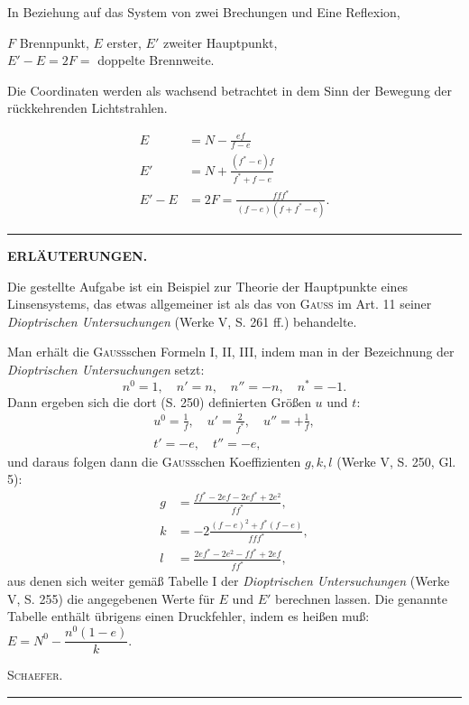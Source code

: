 In Beziehung auf das System von zwei Brechungen und Eine Reflexion,
\begin{center}
$F$ Brennpunkt, $E$ erster, $E'$ zweiter Hauptpunkt,\\
$E'-E=2F=$ doppelte Brennweite.
\end{center}
\noindent Die Coordinaten werden als wachsend betrachtet in dem Sinn der Bewegung der rückkehrenden Lichtstrahlen.
\begin{center}\textbf{}\end{center}
\begin{align}
E&=N-\frac{ef}{f-e}\tag*{I.}\\[5pt]
E'&=N+\frac{(f^{*}-e)f}{f^{*}+f-e}\tag*{II.}\\[5pt]
E'-E&=2F=\frac{fff^{*}}{(f-e)(f+f^{*}-e)}.\tag*{III.}
\end{align}
\begin{center}\rule{.25\linewidth}{.4pt}\end{center}
\clearpage{}
\begin{center}\textbf{ERLÄUTERUNGEN.}\end{center}
\noindent\hspace*{\parindent}Die gestellte Aufgabe ist ein Beispiel zur Theorie der Hauptpunkte eines Linsensystems, das etwas allgemeiner ist als das von \textsc{Gauss} im Art. 11 seiner \textit{Dioptrischen Untersuchungen} (Werke V, S. 261 ff.) behandelte.

Man erhält die \textsc{Gauss}schen Formeln I, II, III, indem man in der Bezeichnung der \textit{Dioptrischen Untersuchungen} setzt:
\[
n^0=1,\quad n'=n,\quad n''=-n,\quad n^{*}=-1.
\]
\noindent Dann ergeben sich die dort (S. 250) definierten Größen $u$ und $t$:
\[
\begin{gathered}
u^0=\frac1f,\quad u'=\frac2{f^{*}},\quad u''=+\frac1f,\\[5pt]
t'=-e,\quad t''=-e,
\end{gathered}
\]
\noindent und daraus folgen dann die \textsc{Gauss}schen Koeffizienten $g,k,l$ (Werke V, S. 250, Gl. 5):
\[
\begin{aligned}
g&=\frac{ff^{*}-2ef-2ef^{*}+2e^2}{ff^{*}},\\[5pt]
k&=-2\frac{(f-e)^2+f^{*}(f-e)}{fff^{*}},\\[5pt]
l&=\frac{2ef^{*}-2e^2-ff^{*}+2ef}{ff^{*}},
\end{aligned}
\]
\noindent aus denen sich weiter gemäß Tabelle I der \textit{Dioptrischen Untersuchungen} (Werke V, S. 255) die angegebenen Werte für $E$ und $E'$ berechnen lassen. Die genannte Tabelle enthält übrigens einen Druckfehler, indem es heißen muß: $E=N^0-\dfrac{n^0(1-e)}k$.
\begin{flushright}\textsc{Schaefer.}\end{flushright}
\begin{center}\rule{.30\linewidth}{.4pt}\end{center}
\clearpage\endgroup
